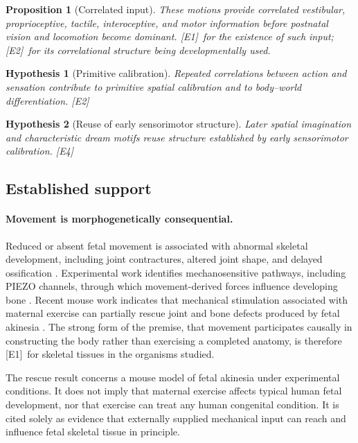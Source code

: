 \documentclass[11pt,a4paper]{article}
\theoremstyle{plain}
\newtheorem{proposition}{Proposition}[section]
\newtheorem{hypothesis}{Hypothesis}[section]
\theoremstyle{definition}
\theoremstyle{remark}
\newcommand{\tier}[1]{\textup{\textsc{[#1]}}}
\newcommand{\Eone}{\tier{E1}}
\newcommand{\Etwo}{\tier{E2}}
\newcommand{\Efour}{\tier{E4}}
\begin{document}
\begin{proposition}[Correlated input]\label{prop:correlated}
These motions provide correlated vestibular, proprioceptive, tactile, interoceptive, and motor information before postnatal vision and locomotion become dominant. \Eone\ for the existence of such input; \Etwo\ for its correlational structure being developmentally used.
\end{proposition}

\begin{hypothesis}[Primitive calibration]\label{hyp:calibration}
Repeated correlations between action and sensation contribute to primitive spatial calibration and to body--world differentiation. \Etwo
\end{hypothesis}

\begin{hypothesis}[Reuse of early sensorimotor structure]\label{hyp:reuse}
Later spatial imagination and characteristic dream motifs reuse structure established by early sensorimotor calibration. \Efour
\end{hypothesis}

\subsection{Established support}

\paragraph{Movement is morphogenetically consequential.} Reduced or absent fetal movement is associated with abnormal skeletal development, including joint contractures, altered joint shape, and delayed ossification \cite{nowlan2010}. Experimental work identifies mechanosensitive pathways, including PIEZO channels, through which movement-derived forces influence developing bone \cite{zhou2020}. Recent mouse work indicates that mechanical stimulation associated with maternal exercise can partially rescue joint and bone defects produced by fetal akinesia \cite{panebianco2025}. The strong form of the premise, that movement participates causally in constructing the body rather than exercising a completed anatomy, is therefore \Eone\ for skeletal tissues in the organisms studied.

\begin{caution}
The rescue result concerns a mouse model of fetal akinesia under experimental conditions. It does not imply that maternal exercise affects typical human fetal development, nor that exercise can treat any human congenital condition. It is cited solely as evidence that externally supplied mechanical input can reach and influence fetal skeletal tissue in principle.
\end{caution}
\end{document}
